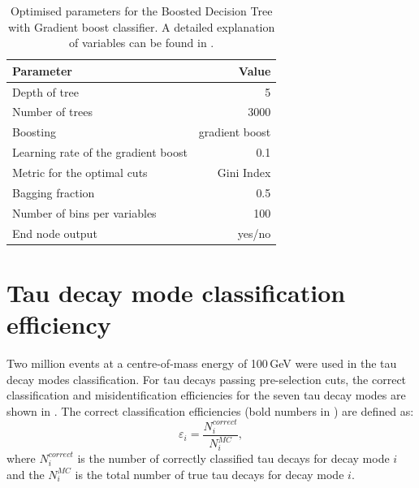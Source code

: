 


\begin{table}[!htbp]\centering
\begin{tabular}{lr}
\hline \hline
 Parameter &  Value \\
\hline
Depth of tree & 5 \\
Number of trees & 3000 \\
Boosting & gradient boost \\
Learning rate of the gradient boost & 0.1 \\
Metric for the optimal cuts & Gini Index \\
Bagging fraction & 0.5 \\
Number of bins per variables & 100 \\
End node output & yes/no \\
\hline \hline
\end{tabular}
\caption
{Optimised parameters for the Boosted Decision Tree with Gradient boost \multiclass classifier. A detailed explanation of variables can be found in .}
\label{tab:tauBDTparameters}
\end{table}


\section{Tau decay mode classification efficiency}
\label{sec:tauClassificationEff}

Two million \eeToTauTau events at a centre-of-mass energy of 100\,GeV were used in the tau decay modes classification. For tau decays passing pre-selection cuts, the correct classification and misidentification  efficiencies for the seven tau decay modes are shown in . The correct classification efficiencies  (bold numbers in )  are defined as:
\begin{equation}
\varepsilon_i = \frac{N^{correct}_i}{N^{MC}_i},
\label{eqn:tauEff}
\end{equation}
where $N^{correct}_i$ is the number of correctly classified tau decays for decay mode $i$ and the $N^{MC}_i$ is the total number of true tau decays for decay mode $i$.



